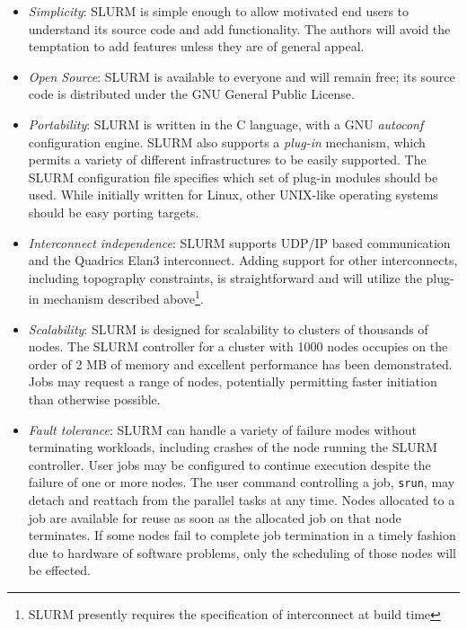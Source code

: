 \begin{itemize}
\item {\em Simplicity}: SLURM is simple enough to allow motivated end users
to understand its source code and add functionality.  The authors will 
avoid the temptation to add features unless they are of general appeal. 

\item {\em Open Source}: SLURM is available to everyone and will remain 
free; its source code is distributed under the GNU General Public 
License\cite{GPL2002}.

\item {\em Portability}: SLURM is written in the C language, with a GNU 
{\em autoconf} configuration engine.  SLURM also supports a {\em plug-in} 
mechanism, which permits a variety of different infrastructures to be 
easily supported. The SLURM configuration file specifies which set of 
plug-in modules should be used. While initially written for Linux, other 
UNIX-like operating systems should be easy porting targets.

\item {\em Interconnect independence}: SLURM supports UDP/IP based
communication and the Quadrics Elan3 interconnect.  Adding support for 
other interconnects, including topography constraints, is straightforward 
and will utilize the plug-in mechanism described above\footnote{SLURM 
presently requires the specification of interconnect at build time}.

\item {\em Scalability}: SLURM is designed for scalability to clusters of
thousands of nodes. The SLURM controller for a cluster with 1000 nodes 
occupies on the order of 2 MB of memory and excellent performance has 
been demonstrated. Jobs may request a range of nodes, potentially 
permitting faster initiation than otherwise possible.

\item {\em Fault tolerance}: SLURM can handle a variety of failure modes
without terminating workloads, including crashes of the node running 
the SLURM controller. 
User jobs may be configured to continue execution despite the failure 
of one or more nodes. 
The user command controlling a job, {\tt srun}, may detach and reattach 
from the parallel tasks at any time. 
Nodes allocated to a job are available for reuse as soon as the allocated 
job on that node terminates. If some nodes fail to complete job termination 
in a timely fashion due to hardware of software problems, only the 
scheduling of those nodes will be effected.


\end{itemize}
